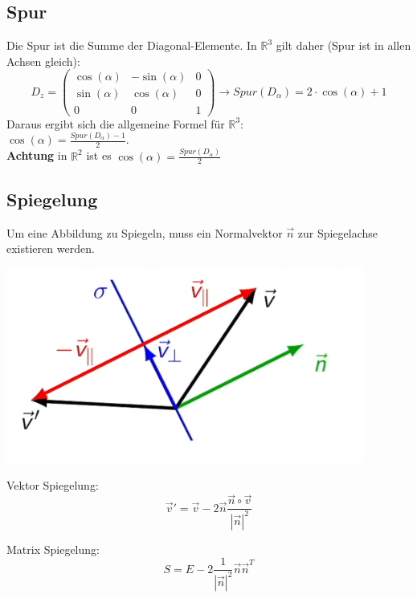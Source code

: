 \subsection{Spur}\label{drehwinkel}
Die Spur ist die Summe der Diagonal-Elemente. In $\mathbb{R}^3$ gilt daher (Spur ist in allen Achsen gleich):
\[
	D_z = \begin{pmatrix}
		\cos(\alpha) & -\sin(\alpha) & 0 \\
		\sin(\alpha) & \cos(\alpha) & 0 \\
		0 & 0 & 1
	\end{pmatrix} \rightarrow  Spur(D_\alpha) = 2 \cdot \cos(\alpha) + 1 
\]
\noindent Daraus ergibt sich die allgemeine Formel für $\mathbb{R}^3$: \\$\cos(\alpha) = \frac{Spur(D_\alpha) - 1}{2}$. \\\textbf{Achtung} in $\mathbb{R}^2$ ist es $\cos(\alpha) = \frac{Spur(D_\alpha)}{2}$

\subsection{Spiegelung}
Um eine Abbildung zu Spiegeln, muss ein Normalvektor $\vec{n}$ zur Spiegelachse existieren werden.

\begin{center}
	\begin{minipage}{0.25\textwidth}
		\includegraphics[width=\linewidth,keepaspectratio=true]{./Images/Spiegelung.png}
	\end{minipage}%
	\begin{minipage}{0.2\textwidth}
		Vektor Spiegelung:
		\[\vec{v}' = \vec{v} - 2\vec{n}\frac{\vec{n} \circ \vec{v}}{|\vec{n}|^2}\]

		Matrix Spiegelung:
		\[S = E - 2\frac{1}{|\vec{n}|^2}\vec{n}\vec{n}^T\]
	\end{minipage}
\end{center}

